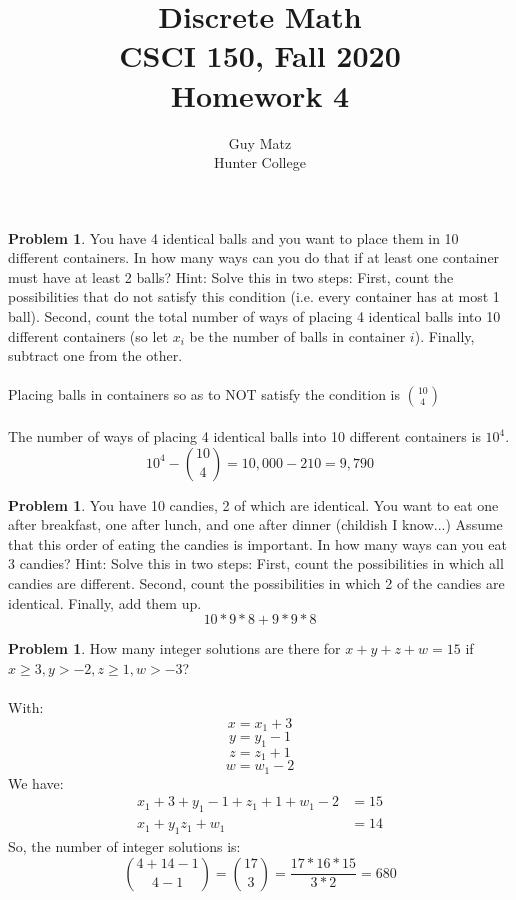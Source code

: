 \documentclass[10pt,leqno ]{article}
\title{Discrete Math\\
CSCI 150, Fall 2020\\
Homework 4}
\author{Guy Matz \\
Hunter College}
\theoremstyle{definition}
\newtheorem{problem}[theorem]{Problem}
\begin{document}
\begin{problem} You  have  4  identical  balls  and  you  want  to  place  them  in  10  different containers.  In how many ways can you do that if at least one container must  have  at  least  2  balls?  Hint:  Solve  this  in  two  steps:  First,  count the  possibilities  that  do  not  satisfy  this  condition  (i.e.   every  container has at most 1 ball).  Second, count the total number of ways of placing 4 identical balls into 10 different containers (so let $x_i$ be the number of balls in container $i$).  Finally, subtract one from the other.
\\\\
\Large
Placing balls in containers so as to NOT satisfy the condition is ${10 \choose 4}$\\\\
The number of ways of placing 4 identical balls into 10 different containers is $10^4$.  
$$ 10^4 - {10 \choose 4} = 10,000 - 210 = 9,790$$
\end{problem}
\newpage

\begin{problem} You have 10 candies, 2 of which are identical.  You want to eat one after breakfast, one after lunch, and one after dinner (childish I know...)  Assume that this order of eating the candies is important.  In how many ways can you eat 3 candies?  Hint:  Solve this in two steps:  First, count the possibilities in which all candies are different.  Second, count the possibilities in which 2 of the candies are identical.  Finally, add them up.
\\
\Large
$$ 10 * 9 * 8 + 9 * 9 * 8$$
\end{problem}
\newpage

\begin{problem} How many integer solutions are there for $x+y+z+w= 15$ if $x \geq 3, y >-2, z \geq 1, w > -3$?
\\
\Large
\\
With:
$$x = x_1 + 3$$
$$y = y_1 - 1$$
$$z = z_1 + 1$$
$$w = w_1  -2$$
We have:
\begin{align*}
x_1 + 3 + y_1 -1 + z_1 + 1 + w_1 -2 &= 15\\
x_1 + y_1 z_1 + w_1 &= 14
\end{align*}
So, the number of integer solutions is:
$${{4 + 14 -1 \choose  {4-1}}} = {17 \choose 3} = \dfrac{17 * 16 * 15}{3*2} = 680$$
\end{problem}
\newpage
\end{document}
